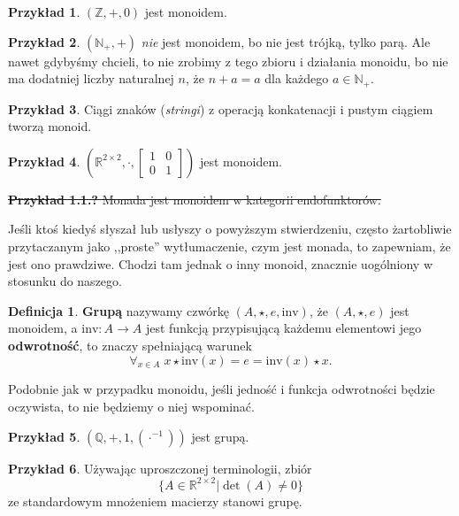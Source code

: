 \documentclass{article}
\theoremstyle{definition}
\newtheorem{definition}{Definicja}[section]
\newtheorem{example}{Przykład}[section]
\begin{document}
\begin{example}
	$(\mathbb{Z}, +, 0)$ jest monoidem.
\end{example}

\begin{example}
	$(\mathbb{N}_+, +)$ \textit{nie} jest monoidem, bo nie jest trójką, tylko parą.
	Ale nawet gdybyśmy chcieli,
		to nie zrobimy z tego zbioru i działania monoidu,
		bo nie ma dodatniej liczby naturalnej $n$,
		że $n + a = a$ dla każdego $a \in \mathbb{N}_+$.
\end{example}

\begin{example}
	Ciągi znaków (\textit{stringi}) z operacją konkatenacji i pustym ciągiem tworzą monoid.
\end{example}

\begin{example}
	$\left(\mathbb{R}^{2 \times 2}, \cdot, \left[\begin{matrix} 1 & 0 \\ 0 & 1 \end{matrix}\right]\right)$ jest monoidem.
\end{example}

\noindent\sout{
	\textbf{Przykład 1.1.?} Monada jest monoidem w kategorii endofunktorów.
}

Jeśli ktoś kiedyś słyszał lub usłyszy o powyższym stwierdzeniu,
	często żartobliwie przytaczanym jako ,,proste'' wytłumaczenie,
	czym jest monada, to zapewniam, że jest ono prawdziwe.
Chodzi tam jednak o inny monoid,
	znacznie uogólniony w stosunku do naszego.

\begin{definition}
    \textbf{Grupą} nazywamy czwórkę $(A, \star, e, \mathrm{inv})$,
		że $(A, \star, e)$ jest monoidem,
		a $\mathrm{inv}: A \to A$ jest funkcją przypisującą każdemu elementowi jego \textbf{odwrotność},
		to znaczy spełniającą warunek
	\begin{equation*}
		\forall_{x \in A}\; {x\star \mathrm{inv}(x) = e = \mathrm{inv}(x) \star x}.
	\end{equation*}
\end{definition}
Podobnie jak w przypadku monoidu,
	jeśli jedność i funkcja odwrotności będzie oczywista,
	to nie będziemy o niej wspominać.

\begin{example}
	$(\mathbb{Q}, +, 1, (\cdot^{-1}))$ jest grupą.
\end{example}

\begin{example}
	Używając uproszczonej terminologii, zbiór
	\begin{equation}
		\{A \in \mathbb{R}^{2 \times 2} | \det(A) \neq 0 \}
	\end{equation}
		ze standardowym mnożeniem macierzy stanowi grupę.
\end{example}
\end{document}
